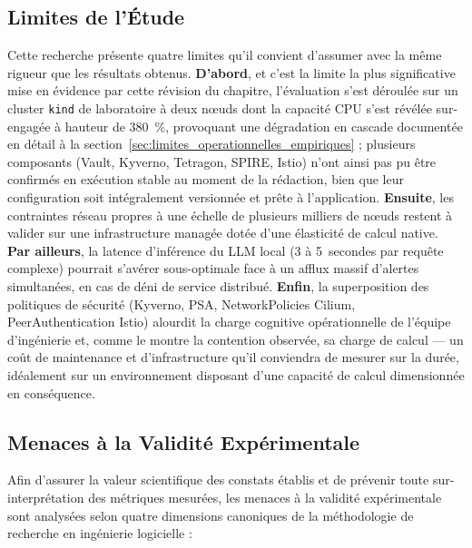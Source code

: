 \subsection{Limites de l'Étude}

Cette recherche présente quatre limites qu'il convient d'assumer avec la même rigueur que les résultats obtenus. \textbf{D'abord}, et c'est la limite la plus significative mise en évidence par cette révision du chapitre, l'évaluation s'est déroulée sur un cluster \texttt{kind} de laboratoire à deux nœuds dont la capacité CPU s'est révélée sur-engagée à hauteur de 380~\%, provoquant une dégradation en cascade documentée en détail à la section~\ref{sec:limites_operationnelles_empiriques} ; plusieurs composants (Vault, Kyverno, Tetragon, SPIRE, Istio) n'ont ainsi pas pu être confirmés en exécution stable au moment de la rédaction, bien que leur configuration soit intégralement versionnée et prête à l'application. \textbf{Ensuite}, les contraintes réseau propres à une échelle de plusieurs milliers de nœuds restent à valider sur une infrastructure managée dotée d'une élasticité de calcul native. \textbf{Par ailleurs}, la latence d'inférence du LLM local (3 à 5~secondes par requête complexe) pourrait s'avérer sous-optimale face à un afflux massif d'alertes simultanées, en cas de déni de service distribué. \textbf{Enfin}, la superposition des politiques de sécurité (Kyverno, PSA, NetworkPolicies Cilium, PeerAuthentication Istio) alourdit la charge cognitive opérationnelle de l'équipe d'ingénierie et, comme le montre la contention observée, sa charge de calcul — un coût de maintenance et d'infrastructure qu'il conviendra de mesurer sur la durée, idéalement sur un environnement disposant d'une capacité de calcul dimensionnée en conséquence.

\subsection{Menaces à la Validité Expérimentale}
\label{subsec:menaces_validite_exp}

Afin d'assurer la valeur scientifique des constats établis et de prévenir toute sur-interprétation des métriques mesurées, les menaces à la validité expérimentale sont analysées selon quatre dimensions canoniques de la méthodologie de recherche en ingénierie logicielle :

